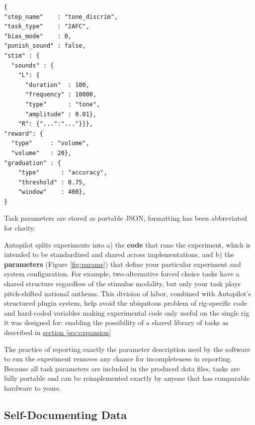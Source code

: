 %
\begin{marginfigure}[5cm]
\begin{verbatim}
{
"step_name"    : "tone_discrim",
"task_type"    : "2AFC",
"bias_mode"    : 0,
"punish_sound" : false,
"stim" : {
  "sounds" : {
    "L": {
      "duration"  : 100,
      "frequency" : 10000,
      "type"      : "tone",
      "amplitude" : 0.01},
    "R": {"...":"..."}}},
"reward": {
  "type"     : "volume",
  "volume"   : 20},
"graduation" : {
    "type"      : "accuracy",
    "threshold" : 0.75,
    "window"    : 400},
}
\end{verbatim}
\caption{Task parameters are stored as portable JSON, formatting has been abbreviated for clarity.}
\label{fig:params}
\end{marginfigure}%
%
%
Autopilot splits experiments into a) the \textbf{code} that runs the experiment, which is intended to be standardized and shared across implementations, and b) the \textbf{parameters} (Figure \ref{fig:params}) that define your particular experiment and system configuration. For example, two-alternative forced choice tasks have a shared structure regardless of the stimulus modality, but only your task plays pitch-shifted national anthems. This division of labor, combined with Autopilot's structured plugin system, help avoid the ubiquitous problem of rig-specific code and hard-coded variables making experimental code only useful on the single rig it was designed for: enabling the possibility of a shared library of tasks as described in \hyperref[sec:expansion]{section \ref{sec:expansion}}%

The practice of reporting exactly the parameter description used by the software to run the experiment removes any chance for incompleteness in reporting. Because all task parameters are included in the produced data files, tasks are fully portable and can be reimplemented exactly by anyone that has comparable hardware to yours. 

\subsection{Self-Documenting Data}
\label{sec:data}

